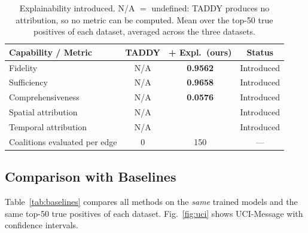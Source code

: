 \documentclass[conference]{IEEEtran}
\newcommand{\cmark}{\ding{51}}
\begin{document}
\begin{table}[!t]
\centering
\caption{Explainability introduced. N/A $=$ undefined: TADDY produces no
attribution, so no metric can be computed. Mean over the top-50 true positives
of each dataset, averaged across the three datasets.}
\label{tab:gap}
\footnotesize
\setlength{\tabcolsep}{4pt}
\begin{tabular}{lccc}
\toprule
\textbf{Capability / Metric} & \textbf{TADDY} &
\textbf{+ Expl.\ (ours)} & \textbf{Status} \\
\midrule
\rowcolor{rowgray}
Fidelity             & N/A & \textbf{0.9562} & Introduced \\
Sufficiency          & N/A & \textbf{0.9658} & Introduced \\
\rowcolor{rowgray}
Comprehensiveness    & N/A & \textbf{0.0576} & Introduced \\
Spatial attribution  & N/A & \cmark          & Introduced \\
\rowcolor{rowgray}
Temporal attribution & N/A & \cmark          & Introduced \\
Coalitions evaluated per edge & 0 & 150      & --- \\
\bottomrule
\end{tabular}
\end{table}

\subsection{Comparison with Baselines}
\label{subsec:baselines}

Table~\ref{tab:baselines} compares all methods on the \emph{same} trained models
and the same top-50 true positives of each dataset. Fig.~\ref{fig:uci} shows
UCI-Message with confidence intervals.
\end{document}
